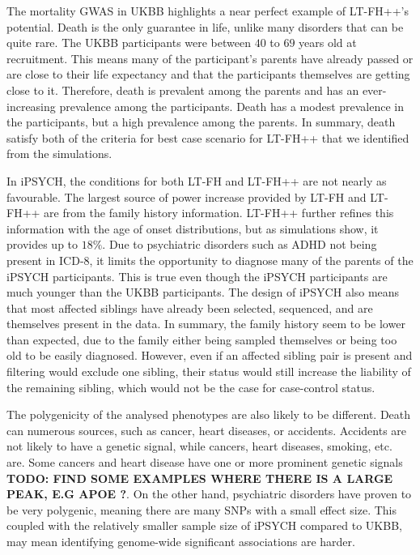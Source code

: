 The mortality GWAS in UKBB highlights a near perfect example of LT-FH++'s potential. Death is the only guarantee in life, unlike many disorders that can be quite rare. The UKBB participants were between $ 40 $ to $ 69 $ years old at recruitment. This means many of the participant's parents have already passed or are close to their life expectancy and that the participants themselves are getting close to it. Therefore, death is prevalent among the parents and has an ever-increasing prevalence among the participants. Death has a modest prevalence in the participants, but a high prevalence among the parents. In summary, death satisfy both of the criteria for best case scenario for LT-FH++ that we identified from the simulations. 

In iPSYCH, the conditions for both LT-FH and LT-FH++ are not nearly as favourable. The largest source of power increase provided by LT-FH and LT-FH++ are from the family history information. LT-FH++ further refines this information with the age of onset distributions, but as simulations show, it provides up to $ 18\% $. Due to psychiatric disorders such as ADHD not being present in ICD-8, it limits the opportunity to diagnose many of the parents of the iPSYCH participants. This is true even though the iPSYCH participants are much younger than the UKBB participants. The design of iPSYCH also means that most affected siblings have already been selected, sequenced, and are themselves present in the data. In summary, the family history seem to be lower than expected, due to the family either being sampled themselves or being too old to be easily diagnosed. However, even if an affected sibling pair is present and filtering would exclude one sibling, their status would still increase the liability of the remaining sibling, which would not be the case for case-control status.

The polygenicity of the analysed phenotypes are also likely to be different. Death can numerous sources, such as cancer, heart diseases, or accidents. Accidents are not likely to have a genetic signal, while cancers, heart diseases, smoking, etc. are. Some cancers and heart disease have one or more prominent genetic signals \textbf{TODO: FIND SOME EXAMPLES WHERE THERE IS A LARGE PEAK, E.G APOE ?}. On the other hand, psychiatric disorders have proven to be very polygenic, meaning there are many SNPs with a small effect size. This coupled with the relatively smaller sample size of iPSYCH compared to UKBB, may mean identifying genome-wide significant associations are harder.

